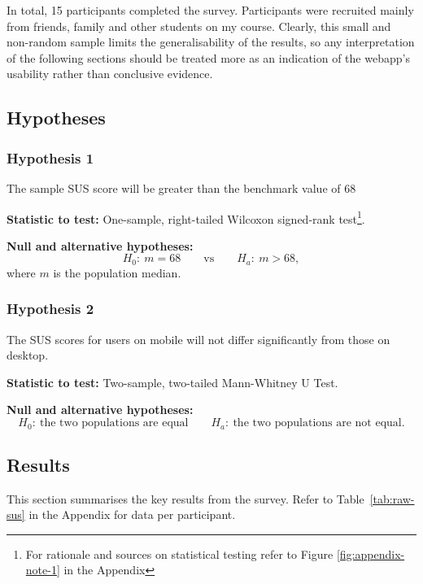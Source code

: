 In total, 15 participants completed the survey. Participants were recruited
mainly from friends, family and other students on my course. Clearly, this small
and non-random sample limits the generalisability of the results, so any
interpretation of the following sections should be treated more as an indication
of the webapp's usability rather than conclusive evidence.

\subsection{Hypotheses}

\subsubsection{Hypothesis 1}
The sample SUS score will be greater than the benchmark value of 68

\textbf{Statistic to test:} One-sample, right-tailed Wilcoxon signed-rank
test\footnote[1]{For rationale and sources on statistical testing refer to
Figure \ref{fig:appendix-note-1} in the Appendix}.

\textbf{Null and alternative hypotheses:}
\[
H_0:\ m = 68 \qquad\text{vs}\qquad H_a:\ m > 68,
\]
where \(m\) is the population median.

\subsubsection{Hypothesis 2}
The SUS scores for users on mobile will not differ significantly from those on
desktop.

\textbf{Statistic to test:} Two-sample, two-tailed Mann-Whitney U
Test\footnotemark[1].

\textbf{Null and alternative hypotheses:}
\[
H_0:\ \text{the two populations are equal} \qquad
H_a:\ \text{the two populations are not equal.}
\]

\subsection{Results}

This section summarises the key results from the survey. Refer to
Table~\ref{tab:raw-sus} in the Appendix for data per participant.

